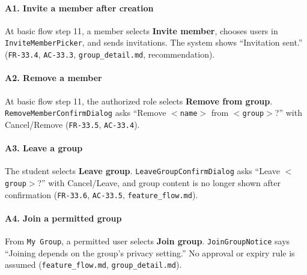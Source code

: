 \documentclass[12pt]{article}
\begin{document}
\hypertarget{sec:a1-invite-a-member-after-creation}{}
\paragraph*{A1. Invite a member after creation}
\par\medskip

At basic flow step 11, a member selects \textbf{Invite member}, chooses users in \texttt{InviteMemberPicker}, and sends invitations. The system shows “Invitation sent.” (\texttt{FR-33.4}, \texttt{AC-33.3}, \texttt{group\_detail.md}, recommendation).
\par\medskip

\hypertarget{sec:a2-remove-a-member}{}
\paragraph*{A2. Remove a member}
\par\medskip

At basic flow step 11, the authorized role selects \textbf{Remove from group}. \texttt{RemoveMemberConfirmDialog} asks “Remove \texttt{$<$name$>$} from \texttt{$<$group$>$}?” with Cancel/Remove (\texttt{FR-33.5}, \texttt{AC-33.4}).
\par\medskip

\hypertarget{sec:a3-leave-a-group}{}
\paragraph*{A3. Leave a group}
\par\medskip

The student selects \textbf{Leave group}. \texttt{LeaveGroupConfirmDialog} asks “Leave \texttt{$<$group$>$}?” with Cancel/Leave, and group content is no longer shown after confirmation (\texttt{FR-33.6}, \texttt{AC-33.5}, \texttt{feature\_flow.md}).
\par\medskip

\hypertarget{sec:a4-join-a-permitted-group}{}
\paragraph*{A4. Join a permitted group}
\par\medskip

From \texttt{My Group}, a permitted user selects \textbf{Join group}. \texttt{JoinGroupNotice} says “Joining depends on the group's privacy setting.” No approval or expiry rule is assumed (\texttt{feature\_flow.md}, \texttt{group\_detail.md}).
\par\medskip
\end{document}
